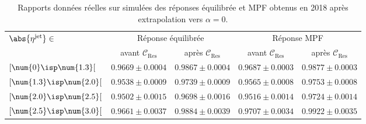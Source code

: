 \begin{table}[p]
\centering
\begin{tabular}{lcccc}
\toprule
\multirow{2}{*}{$\abs{\eta^\text{jet}}\in$} & \multicolumn{2}{c}{Réponse équilibrée} & \multicolumn{2}{c}{Réponse MPF} \\
\cmidrule(lr){2-3}\cmidrule(lr){4-5}
 & avant $\mathcal{C}_\text{Res}$ & après $\mathcal{C}_\text{Res}$ & avant $\mathcal{C}_\text{Res}$ & après $\mathcal{C}_\text{Res}$ \\
\midrule
$[\num{0}\isp \num{1.3}[$ & $\num{0.9669}\pm\num{0.0004}$ & $\num{0.9867}\pm\num{0.0004}$ & $\num{0.9687}\pm\num{0.0003}$ & $\num{0.9877}\pm\num{0.0003}$ \\
$[\num{1.3}\isp \num{2.0}[$ & $\num{0.9538}\pm\num{0.0009}$ & $\num{0.9739}\pm\num{0.0009}$ & $\num{0.9565}\pm\num{0.0008}$ & $\num{0.9753}\pm\num{0.0008}$ \\
$[\num{2.0}\isp \num{2.5}[$ & $\num{0.9502}\pm\num{0.0015}$ & $\num{0.9698}\pm\num{0.0016}$ & $\num{0.9516}\pm\num{0.0014}$ & $\num{0.9724}\pm\num{0.0014}$ \\
$[\num{2.5}\isp \num{3.0}[$ & $\num{0.9661}\pm\num{0.0037}$ & $\num{0.9884}\pm\num{0.0039}$ & $\num{0.9707}\pm\num{0.0034}$ & $\num{0.9922}\pm\num{0.0035}$ \\
\bottomrule
\end{tabular}
\caption[Rapports des réponses équilibrée et MPF obtenus en 2018 après extrapolation vers $\alpha=0$.]{Rapports données réelles sur simulées des réponses équilibrée et MPF obtenus en 2018 après extrapolation vers $\alpha=0$.}
\label{tab-responses_recap_table_L2L3Res_cross_check_2018ABCD}
\end{table}